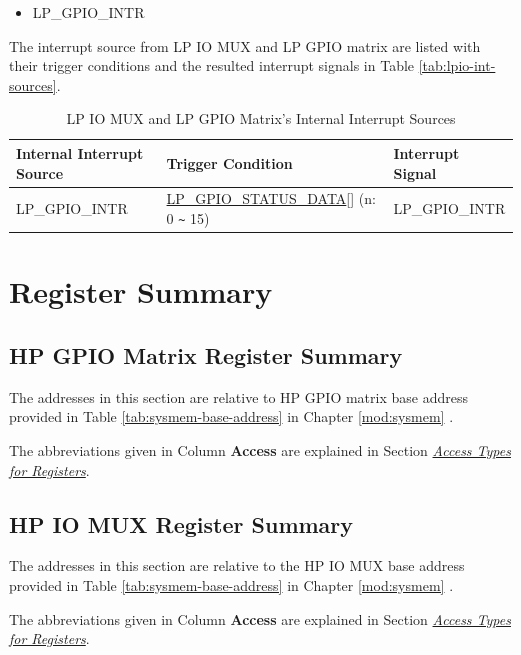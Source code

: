\documentclass[main\_\_EN.tex]{subfiles}
\begin{document}
    \begin{itemize}
        \item LP\_GPIO\_INTR
    \end{itemize}

The interrupt source from LP IO MUX and LP GPIO matrix are listed with their trigger conditions and the resulted interrupt signals in Table \ref{tab:lpio-int-sources}.
\begin{longtable}{ | L{5cm} | L{6.5cm} | L{4cm} | }
\caption{LP IO MUX and LP GPIO Matrix's Internal Interrupt Sources} \label{tab:lpio-int-sources}
\\ \hline
{}
\textbf{Internal Interrupt Source} & \textbf{Trigger Condition}  &  \textbf{Interrupt Signal}\\ \hline

\label{int:LPGPIOINT}LP\_GPIO\_INTR  &  \hyperref[fielddesc:LPGPIOSTATUSDATA]{LP\_GPIO\_STATUS\_DATA}[] (n: 0 \verb+~+ 15) &  LP\_GPIO\_INTR  \\ \hline
\end{longtable}

\hypertarget{iomuxgpio-reg-summ}{}
\section{Register Summary}
\subsection{HP GPIO Matrix Register Summary}
\label{sec:hp-gpio-reg-summ}
The addresses in this section are relative to HP GPIO matrix base address provided in Table \ref{tab:sysmem-base-address} in Chapter \ref{mod:sysmem} \textit{}.

The abbreviations given in Column \textbf{Access} are explained in Section \hyperref[glossary-access-types]{\textit{Access Types for Registers}}.




\subsection{HP IO MUX Register Summary}
The addresses in this section are relative to the HP IO MUX base address provided in Table \ref{tab:sysmem-base-address} in Chapter \ref{mod:sysmem} \textit{}.

The abbreviations given in Column \textbf{Access} are explained in Section \hyperref[glossary-access-types]{\textit{Access Types for Registers}}.
\end{document}
